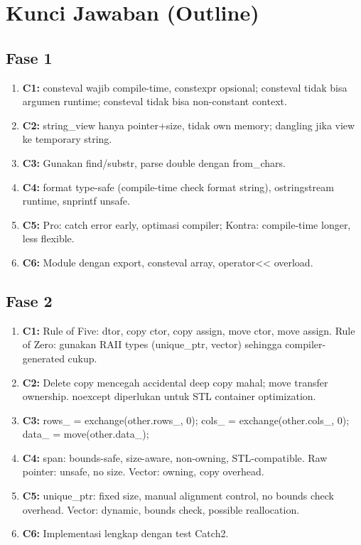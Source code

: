 \documentclass[12pt,a4paper]{article}
\begin{document}
\newpage
\section*{Kunci Jawaban (Outline)}

\subsection*{Fase 1}
\begin{enumerate}
  \item \textbf{C1:} consteval wajib compile-time, constexpr opsional; consteval tidak bisa argumen runtime; consteval tidak bisa non-constant context.
  \item \textbf{C2:} string\_view hanya pointer+size, tidak own memory; dangling jika view ke temporary string.
  \item \textbf{C3:} Gunakan find/substr, parse double dengan from_chars.
  \item \textbf{C4:} format type-safe (compile-time check format string), ostringstream runtime, snprintf unsafe.
  \item \textbf{C5:} Pro: catch error early, optimasi compiler; Kontra: compile-time longer, less flexible.
  \item \textbf{C6:} Module dengan export, consteval array, operator<< overload.
\end{enumerate}

\subsection*{Fase 2}
\begin{enumerate}
  \item \textbf{C1:} Rule of Five: dtor, copy ctor, copy assign, move ctor, move assign. Rule of Zero: gunakan RAII types (unique_ptr, vector) sehingga compiler-generated cukup.
  \item \textbf{C2:} Delete copy mencegah accidental deep copy mahal; move transfer ownership. noexcept diperlukan untuk STL container optimization.
  \item \textbf{C3:} rows\_ = exchange(other.rows\_, 0); cols\_ = exchange(other.cols\_, 0); data\_ = move(other.data\_);
  \item \textbf{C4:} span: bounds-safe, size-aware, non-owning, STL-compatible. Raw pointer: unsafe, no size. Vector: owning, copy overhead.
  \item \textbf{C5:} unique_ptr: fixed size, manual alignment control, no bounds check overhead. Vector: dynamic, bounds check, possible reallocation.
  \item \textbf{C6:} Implementasi lengkap dengan test Catch2.
\end{enumerate}
\end{document}
